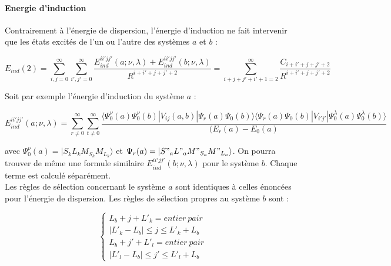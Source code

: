 	
	\paragraph{Energie d’induction}
	
	Contrairement à l'énergie de dispersion, l'énergie d'induction ne fait intervenir que les états excités de l'un ou l'autre des systèmes $a$ et $b$ : 
	
	\begin{equation}
	E_{ind}(2) = \sum_{i,j=0}^{\infty} \sum_{i',j'=0}^{\infty} \frac{E_{ind}^{ii'jj'} (a; \nu , \lambda) + E_{ind}^{ii'jj'} (b; \nu , \lambda)}{R^{i+i'+j+j'+2}} = \sum_{i+j+j'+i'+1=2}^{\infty} \frac{C_{i+i'+j+j'+2}}{R^{i+i'+j+j'+2}}
	\end{equation}
	
	Soit par exemple l'énergie d'induction du système $a$ :
	
	\begin{equation}
	E_{ind}^{ii'jj'} (a;\nu , \lambda) = \sum_{r \neq 0}^{\infty} \sum_{t\neq 0}^{\infty} \frac{\langle \Psi_{0}^{\nu} (a) \Psi_{0}^{\nu} (b) |V_{ij} (a,b)|\Psi_{r} (a) \Psi_{0} (b) \rangle  \langle \Psi_{r} (a)\Psi_{0} (b) |V_{i'j'}|\Psi_{0}^{\lambda} (a) \Psi_{0}^{\lambda}(b) \rangle}{(E_{r} (a) - E_{0}(a)}
	\end{equation}
	
	\noindent avec $\Psi_{0}^{\nu} (a) = |S_{k} L_{k} M_{S_{k}} M_{L_{k}}\rangle$ et $\Psi_{r}(a) = |S"_{a} L"_{a} M"_{S_{a}} M"_{L_{a}}\rangle$. On pourra trouver de même une formule similaire $E_{ind}^{ii'jj'} (b;\nu , \lambda)$ pour le système $b$. Chaque terme est calculé séparément.\\
	
	Les règles de sélection concernant le système $a$ sont identiques à celles énoncées pour l'énergie de dispersion.
	Les règles de sélection propres au système $b$ sont : 
	
	\begin{equation}
	\begin{cases}
	L_{b} + j + L'_{k} = entier\ pair \\
	|L'_{k} - L_{b}| \leq j \leq L'_{k} + L_{b} \\
	L_{b} + j' + L'_{l} = entier\ pair \\
	|L'_{l} - L_{b}| \leq j' \leq L'_{l} + L_{b}
	\end{cases}
	\end{equation}
	
